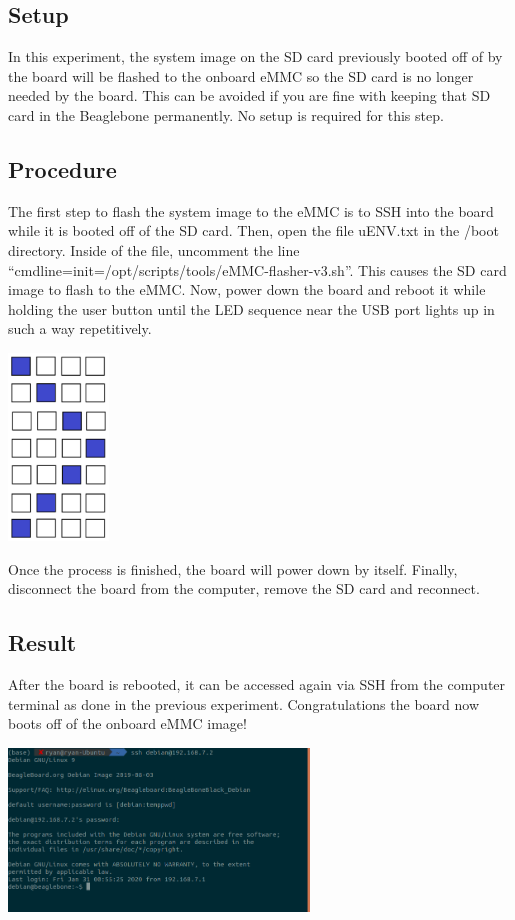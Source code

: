 \documentclass{article}
\begin{document}
\subsection{Setup}
In this experiment, the system image on the SD card previously booted off of by the board will be flashed to the onboard eMMC so the SD card is no longer needed by the board. This can be avoided if you are fine with keeping that SD card in the Beaglebone permanently. No setup is required for this step.
\subsection{Procedure}
The first step to flash the system image to the eMMC is to SSH into the board while it is booted off of the SD card. Then, open the file uENV.txt in the /boot directory. Inside of the file, uncomment the line “cmdline=init=/opt/scripts/tools/eMMC-flasher-v3.sh”. This causes the SD card image to flash to the eMMC. Now, power down the board and reboot it while holding the user button until the LED sequence near the USB port lights up in such a way repetitively.
\begin{center}
	\includegraphics[width=0.2\textwidth]{img/Lab1_2.PNG}
\end{center}
Once the process is finished, the board will power down by itself. Finally, disconnect the board from the computer, remove the SD card and reconnect.
\subsection{Result}
After the board is rebooted, it can be accessed again via SSH from the computer terminal as done in the previous experiment. Congratulations the board now boots off of the onboard eMMC image!
\begin{center}
	\includegraphics[width=0.6\textwidth]{img/Lab1_3.PNG}
\end{center}
\clearpage
\end{document}
